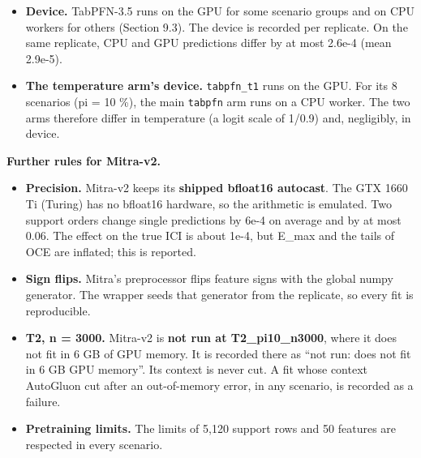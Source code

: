 \documentclass[
  10pt,
]{article}
\providecommand{\tightlist}{%
  \setlength{\itemsep}{0pt}\setlength{\parskip}{0pt}}
\begin{document}
\begin{itemize}
  \begin{itemize}
  \tightlist
  \item
    Fast is 4.5-5.4 times faster. Peak GPU memory was
    2.1-2.9 GB for the standard checkpoint and 1.0-2.2 GB
    for Fast.
  \item
    With the standard checkpoint, schedule P4 (Section 9.3)
    finishes in about 3 days.
  \item
    The plan's budget fallback ``use the Fast variant''
    therefore does not apply.
  \item
    The main arm is the standard checkpoint: the default of
    \texttt{ModelVersion.V3\_5}, and the model the vendor
    ships as TabPFN-3.5.
  \item
    The Fast checkpoint
    (\texttt{tabpfn-v3.5-fast-20260909.safetensors}; SHA-256
    in Section 13) is recorded but not used.
  \end{itemize}
\item
  \textbf{Device.} TabPFN-3.5 runs on the GPU for some
  scenario groups and on CPU workers for others (Section
  9.3). The device is recorded per replicate. On the same
  replicate, CPU and GPU predictions differ by at most
  2.6e-4 (mean 2.9e-5).
\item
  \textbf{The temperature arm's device.} \texttt{tabpfn\_t1}
  runs on the GPU. For its 8 scenarios (pi = 10 \%), the
  main \texttt{tabpfn} arm runs on a CPU worker. The two
  arms therefore differ in temperature (a logit scale of
  1/0.9) and, negligibly, in device.
\end{itemize}

\textbf{Further rules for Mitra-v2.}

\begin{itemize}
\tightlist
\item
  \textbf{Precision.} Mitra-v2 keeps its \textbf{shipped
  bfloat16 autocast}. The GTX 1660 Ti (Turing) has no
  bfloat16 hardware, so the arithmetic is emulated. Two
  support orders change single predictions by 6e-4 on
  average and by at most 0.06. The effect on the true ICI is
  about 1e-4, but E\_max and the tails of OCE are inflated;
  this is reported.
\item
  \textbf{Sign flips.} Mitra's preprocessor flips feature
  signs with the global numpy generator. The wrapper seeds
  that generator from the replicate, so every fit is
  reproducible.
\item
  \textbf{T2, n = 3000.} Mitra-v2 is \textbf{not run at
  T2\_pi10\_n3000}, where it does not fit in 6 GB of GPU
  memory. It is recorded there as ``not run: does not fit in
  6 GB GPU memory''. Its context is never cut. A fit whose
  context AutoGluon cut after an out-of-memory error, in any
  scenario, is recorded as a failure.
\item
  \textbf{Pretraining limits.} The limits of 5,120 support
  rows and 50 features are respected in every scenario.
\end{itemize}
\end{document}

